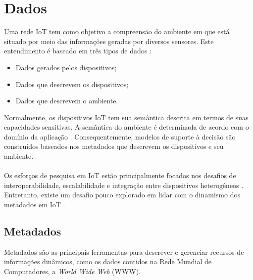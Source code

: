 \section{Dados}%
\label{sec:dados}
	\quad Uma rede \acrlong{IoT} tem como objetivo a compreensão do ambiente em que está situado por meio das informações geradas por diversos
  sensores. Este entendimento é baseado em três tipos de dados \cite{SemIOT}:
  \begin{itemize}
    \item Dados gerados pelos dispositivos;
    \item Dados que descrevem os dispositivos;
    \item Dados que descrevem o ambiente.
  \end{itemize}
  \quad Normalmente, os dispositivos \acrshort{IoT} tem sua semântica descrita em termos de suas capacidades sensitivas. A semântica do ambiente
  é determinada de acordo com o domínio da aplicação \cite{IOTdata}. Consequentemente, modelos de suporte à decisão são construídos
  baseados nos metadados que descrevem os dispositivos e seu ambiente.
  \\\\ \null
  \quad
  Os esforços de pesquisa em \acrlong{IoT} estão principalmente focados nos desafios de interoperabilidade, escalabilidade e integração entre dispositivos heterogêneos \cite{IOTdata}.
  Entretanto, existe um desafio pouco explorado em lidar com o dinamismo dos metadados em \acrshort{IoT} \cite{collaborative}.

	\subsection{Metadados}
  \quad Metadados são as principais ferramentas para descrever e gerenciar recursos de informações  dinâmicos, como os dados contidos na Rede Mundial de Computadores, a \textit{World Wide Web} (WWW).
